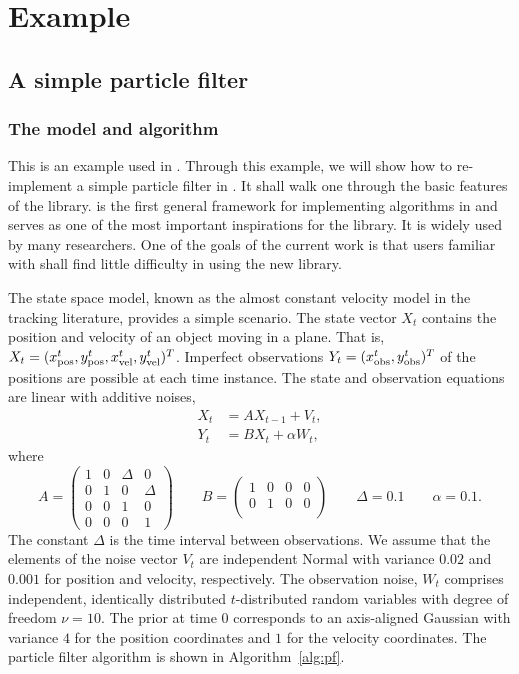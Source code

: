 \documentclass[11pt, fontset=Minion, showoverfull,
bib, mintcode, minted=cache]{marticle}
\begin{document}
\section{Example}
\label{sec:Example}

\subsection{A simple particle filter}
\label{sub:A simple particle filter}

\subsubsection{The model and algorithm}

This is an example used in \smctc \parencite{smctc}. Through this example, we
will show how to re-implement a simple particle filter in \vsmc. It shall walk
one through the basic features of the library. \smctc is the first general
framework for implementing \smc algorithms in \cpp and serves as one of the
most important inspirations for the \vsmc library. It is widely used by many
researchers. One of the goals of the current work is that users familiar with
\smctc shall find little difficulty in using the new library.

The state space model, known as the almost constant velocity model in the
tracking literature, provides a simple scenario. The state vector $X_t$
contains the position and velocity of an object moving in a plane. That is,
$X_t = (x_{\mathrm{pos}}^t, y_{\mathrm{pos}}^t, x_{\mathrm{vel}}^t, y_{\mathrm{vel}}^t)^T$. Imperfect observations $Y_t =
(x_{\mathrm{obs}}^t, y_{\mathrm{obs}}^t)^T$ of the positions are possible at each time instance. The
state and observation equations are linear with additive noises,
\begin{align*}
  X_t &= AX_{t-1} + V_t, \\
  Y_t &= BX_t + \alpha W_t,
\end{align*}
where
\begin{equation*}
  A = \begin{pmatrix}
    1 & 0 & \Delta & 0 \\
    0 & 1 & 0 & \Delta \\
    0 & 0 & 1 & 0 \\
    0 & 0 & 0 & 1
  \end{pmatrix} \qquad
  B = \begin{pmatrix}
    1 & 0 & 0 & 0 \\
    0 & 1 & 0 & 0 \\
  \end{pmatrix} \qquad
  \Delta = 0.1 \qquad
  \alpha = 0.1.
\end{equation*}
The constant $\Delta$ is the time interval between observations. We assume
that the elements of the noise vector $V_t$ are independent Normal with
variance $0.02$ and $0.001$ for position and velocity, respectively. The
observation noise, $W_t$ comprises independent, identically distributed
$t$-distributed random variables with degree of freedom $\nu = 10$. The prior
at time $0$ corresponds to an axis-aligned Gaussian with variance $4$ for the
position coordinates and $1$ for the velocity coordinates. The particle filter
algorithm is shown in Algorithm~\ref{alg:pf}.
\end{document}
